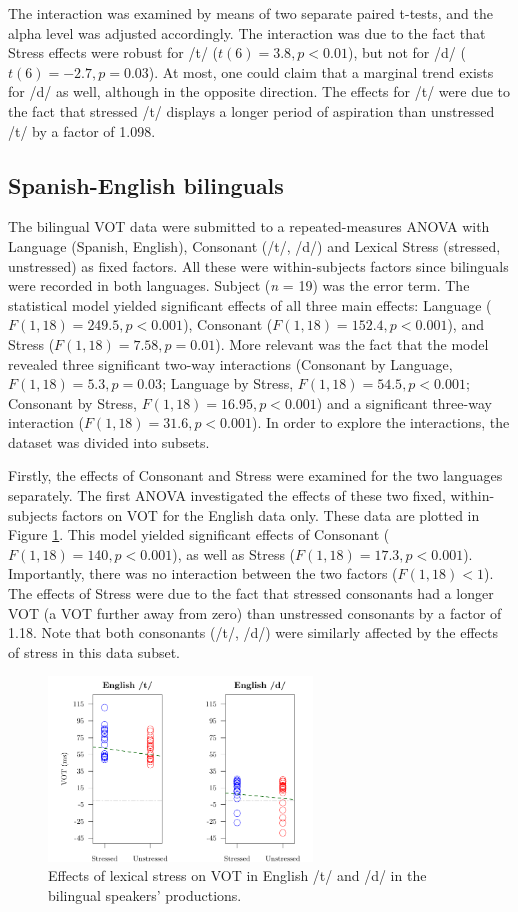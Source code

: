 \documentclass[a4paper]{article}
\begin{document}
The interaction was examined by means of two separate paired t-tests, and the alpha level was adjusted accordingly. The interaction was due to the fact that Stress effects were robust for /t/ ($t(6) = 3.8, p < 0.01$), but not for /d/ ($t(6) = -2.7, p = 0.03$). At most, one could claim that a marginal trend exists for /d/ as well, although in the opposite direction. The effects for /t/ were due to the fact that stressed /t/ displays a longer period of aspiration than unstressed /t/ by a factor of 1.098.

\subsection{Spanish-English bilinguals}

The bilingual VOT data were submitted to a repeated-measures ANOVA with Language (Spanish, English), Consonant (/t/, /d/) and Lexical Stress (stressed, unstressed) as fixed factors. All these were within-subjects factors since bilinguals were recorded in both languages. Subject (\emph{n} = 19) was the error term. The statistical model yielded significant effects of all three main effects: Language ($F(1,18) = 249.5, p < 0.001$), Consonant ($F(1,18) = 152.4, p < 0.001$), and Stress ($F(1,18) = 7.58, p = 0.01$). More relevant was the fact that the model revealed three significant two-way interactions (Consonant by Language, $F(1,18) = 5.3, p = 0.03$; Language by Stress, $F(1,18) = 54.5, p < 0.001$; Consonant by Stress, $F(1,18) = 16.95, p < 0.001$) and a significant three-way interaction ($F(1,18) = 31.6, p < 0.001$). In order to explore the interactions, the dataset was divided into subsets.

Firstly, the effects of Consonant and Stress were examined for the two languages separately. The first ANOVA investigated the effects of these two fixed, within-subjects factors on VOT for the English data only. These data are plotted in Figure \ref{fig:eng}. This model yielded significant effects of Consonant ($F(1,18) = 140, p < 0.001$), as well as Stress ($F(1,18) = 17.3, p < 0.001$). Importantly, there was no interaction between the two factors ($F(1,18) < 1$). The effects of Stress were due to the fact that stressed consonants had a longer VOT (a VOT further away from zero) than unstressed consonants by a factor of 1.18. Note that both consonants (/t/, /d/) were similarly affected by the effects of stress in this data subset.

	\begin{figure}
		\centering
		\caption[English]{Effects of lexical stress on VOT in English /t/ and /d/ in the bilingual speakers' productions. \label{fig:eng}}
		\includegraphics[width=70mm]{figures/bil_eng.pdf}
	\end{figure}
\end{document}
